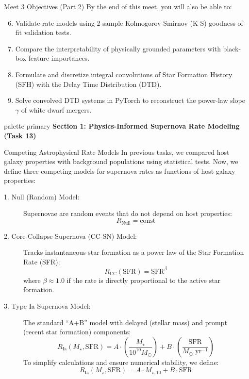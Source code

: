 \documentclass[9pt]{beamer}
\begin{document}
\begin{frame}{Meet 3 Objectives (Part 2)}
  By the end of this meet, you will also be able to:
  \begin{enumerate}
    \setcounter{enumi}{5}
    \item Validate rate models using 2-sample Kolmogorov-Smirnov (K-S) goodness-of-fit validation tests.
    \item Compare the interpretability of physically grounded parameters with black-box feature importances.
    \item Formulate and discretize integral convolutions of Star Formation History (SFH) with the Delay Time Distribution (DTD).
    \item Solve convolved DTD systems in PyTorch to reconstruct the power-law slope $\gamma$ of white dwarf mergers.
  \end{enumerate}
\end{frame}

\begin{frame}[plain]
  \vfill
  \centering
  \begin{beamercolorbox}[sep=8pt,center,shadow=true,rounded=true]{palette primary}
    \textbf{Section 1: Physics-Informed Supernova Rate Modeling (Task 13)}
  \end{beamercolorbox}
  \vfill
\end{frame}

\begin{frame}{Competing Astrophysical Rate Models}
  In previous tasks, we compared host galaxy properties with background populations using statistical tests. Now, we define three competing models for supernova rates as functions of host galaxy properties:
  \begin{description}
    \item[1. Null (Random) Model:] Supernovae are random events that do not depend on host properties:
      $$R_{\text{Null}} = \text{const}$$
    \item[2. Core-Collapse Supernova (CC-SN) Model:] Tracks instantaneous star formation as a power law of the Star Formation Rate (SFR):
      $$R_{\text{CC}}(\text{SFR}) = \text{SFR}^\beta$$
      where $\beta \approx 1.0$ if the rate is directly proportional to the active star formation.
    \item[3. Type Ia Supernova Model:] The standard ``A+B'' model with delayed (stellar mass) and prompt (recent star formation) components:
      $$R_{\text{Ia}}(M_\star, \text{SFR}) = A \cdot \left(\frac{M_\star}{10^{10} M_\odot}\right) + B \cdot \left(\frac{\text{SFR}}{M_\odot \text{ yr}^{-1}}\right)$$
      To simplify calculations and ensure numerical stability, we define:
      $$R_{\text{Ia}}(M_\star, \text{SFR}) = A \cdot M_{\star, 10} + B \cdot \text{SFR}$$
  \end{description}
\end{frame}
\end{document}
